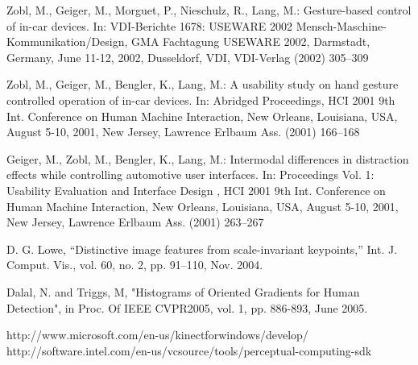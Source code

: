\documentclass[a4paper,11pt,oneside]{book}
\begin{document}
\begin{thebibliography}{2}
 Zobl, M., Geiger, M., Morguet, P., Nieschulz, R., Lang, M.: Gesture-based control of in-car devices. In: VDI-Berichte 1678: USEWARE 2002 Mensch-Maschine-Kommunikation/Design, GMA Fachtagung USEWARE 2002, Darmstadt, Germany, June 11-12, 2002, Dusseldorf, VDI, VDI-Verlag (2002) 305–309

 Zobl, M., Geiger, M., Bengler, K., Lang, M.: A usability study on hand gesture controlled operation of in-car devices. In: Abridged Proceedings, HCI 2001 9th Int. Conference on Human Machine Interaction, New Orleans, Louisiana, USA, August 5-10, 2001, New Jersey, Lawrence Erlbaum Ass. (2001) 166–168

 Geiger, M., Zobl, M., Bengler, K., Lang, M.: Intermodal differences in distraction effects while controlling automotive user interfaces. In: Proceedings Vol. 1: Usability Evaluation and Interface Design , HCI 2001 9th Int. Conference on Human Machine Interaction, New Orleans, Louisiana, USA, August 5-10, 2001, New Jersey, Lawrence Erlbaum Ass. (2001) 263–267

 D. G. Lowe, “Distinctive image features from scale-invariant keypoints,” Int. J. Comput. Vis., vol. 60, no. 2, pp. 91–110, Nov. 2004. 

 Dalal, N. and Triggs, M, "Histograms of Oriented Gradients for Human Detection", in Proc. Of IEEE CVPR2005, vol. 1, pp. 886-893, June 2005.

 http://www.microsoft.com/en-us/kinectforwindows/develop/
 http://software.intel.com/en-us/vcsource/tools/perceptual-computing-sdk

\end{thebibliography}
\end{document}
